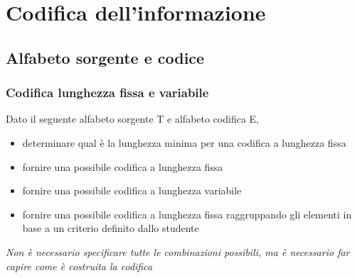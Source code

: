 \documentclass[11pt,fleqn]{book}
\begin{document}

\part{Codifica dell'informazione}



\chapter{Alfabeto sorgente e codice}

\newpage

\section{Codifica lunghezza fissa e variabile}

Dato il seguente alfabeto sorgente T e alfabeto codifica E,
\begin{itemize}
    \item determinare qual è la lunghezza minima per una codifica a lunghezza fissa
    \item fornire una possibile codifica a lunghezza fissa 
    \item fornire una possibile codifica a lunghezza variabile
    \item fornire una possibile codifica a lunghezza fissa raggruppando gli elementi in base a un criterio definito dallo studente
\end{itemize}
\emph{Non è necessario specificare tutte le combinazioni possibili, ma è necessario far capire come è costruita la codifica}
\vspace{0.5cm}
\end{document}
